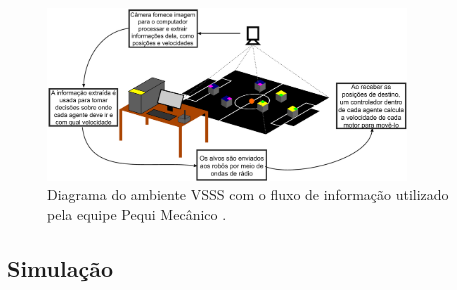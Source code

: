     \begin{figure}[H]
     \centering
     \includegraphics[width=0.85\textwidth]{./fig/ambiente_pequi.png}
    
     \caption{Diagrama do ambiente VSSS com o fluxo de informação utilizado pela equipe Pequi Mecânico \cite{bruno_brandao}.}
     \label{fig:ambiente_pequi}
    \end{figure}



    
    
    
    

\subsection{Simulação}
\label{subsec:simulacao}

